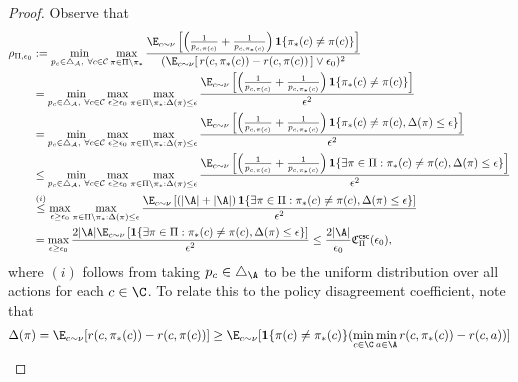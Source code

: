 \documentclass{article}
\newcommand{\mc}[1]{\mathcal{#1}}
\newcommand{\1}{\mathbf{1}}
\renewcommand{\v}{r} %
\begin{document}
\begin{proof}
Observe that
\begin{align*}
    \rho_{\Pi,\epsilon_0} &:= \min_{p_c \in \triangle_{\mc{A}}, \ \forall c \in \mc{C} }  \max_{\pi \in \Pi \setminus \pi_* } \frac{ \E_{c \sim \nu} \left[ \left(\frac{1}{p_{c,\pi(c)}}+ \frac{1}{p_{c,\pi_*(c)}}\right) \1\{\pi_*(c) \neq \pi(c) \} \right] }{(\E_{c \sim \nu}[ \, \v(c,\pi_*(c)) - \v(c,\pi(c)) \, ] \vee \epsilon_0)^2}\\
    &= \min_{p_c \in \triangle_{\mc{A}}, \ \forall c \in \mc{C} } \max_{\epsilon\geq \epsilon_0} \max_{\pi \in \Pi \setminus \pi_*:\Delta(\pi)\leq \epsilon }\frac{ \E_{c \sim \nu} \left[ \left(\frac{1}{p_{c,\pi(c)}}+ \frac{1}{p_{c,\pi_*(c)}}\right) \1\{\pi_*(c) \neq \pi(c) \} \right] }{\epsilon^2}\\
    &= \min_{p_c \in \triangle_{\mc{A}}, \ \forall c \in \mc{C} } \max_{\epsilon\geq \epsilon_0} \max_{\pi \in \Pi \setminus \pi_*:\Delta(\pi)\leq \epsilon }\frac{ \E_{c \sim \nu} \left[ \left(\frac{1}{p_{c,\pi(c)}}+ \frac{1}{p_{c,\pi_*(c)}}\right) \1\{\pi_*(c) \neq \pi(c),\Delta(\pi)\leq\epsilon \} \right] }{\epsilon^2}\\
    &\leq \min_{p_c \in \triangle_{\mc{A}}, \ \forall c \in \mc{C} } \max_{\epsilon\geq \epsilon_0} \max_{\pi \in \Pi \setminus \pi_*:\Delta(\pi)\leq \epsilon }\frac{ \E_{c \sim \nu} \left[ \left(\frac{1}{p_{c,\pi(c)}}+ \frac{1}{p_{c,\pi_*(c)}}\right) \1\{\exists\pi\in\Pi:\pi_*(c) \neq \pi(c),\Delta(\pi)\leq\epsilon \} \right] }{\epsilon^2}\\
    &\overset{(i)}{\leq} \max_{\epsilon\geq \epsilon_0} \max_{\pi \in \Pi \setminus \pi_*:\Delta(\pi)\leq \epsilon }\frac{ \E_{c \sim \nu} \left[ \left(|\A|+|\A|\right) \1\{\exists\pi\in\Pi:\pi_*(c) \neq \pi(c),\Delta(\pi)\leq\epsilon \} \right] }{\epsilon^2}\\
    &= \max_{\epsilon\geq \epsilon_0}\frac{ 2|\A|\E_{c \sim \nu} \left[  \1\{\exists\pi\in\Pi:\pi_*(c) \neq \pi(c),\Delta(\pi)\leq\epsilon \} \right] }{\epsilon^2}\leq \frac{2|\A|}{\epsilon_0} \mathfrak{C}_{\Pi}^{\mathsf{csc}}(\epsilon_0),
\end{align*}
where $(i)$ follows from taking $p_c\in\triangle_\A$ to be the uniform distribution over all actions for each $c\in\C$. 
To relate this to the policy disagreement coefficient, note that \begin{align*}
    \Delta(\pi)=\E_{c\sim\nu}[r(c,\pi_*(c))-r(c,\pi(c))]&\geq \E_{c\sim\nu}[\1\{\pi(c)\ne\pi_*(c)\}(\min_{c\in\C}\min_{a\in\A}r(c,\pi_*(c))-r(c,a))]\\

\end{align*}
\end{proof}
\end{document}
